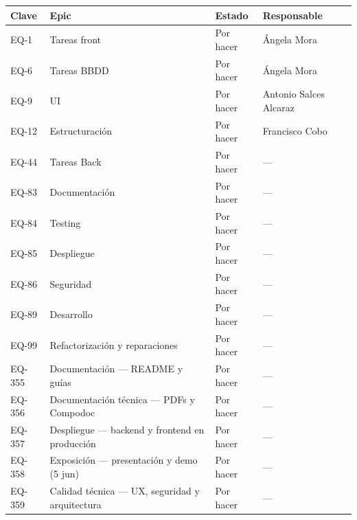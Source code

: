 \documentclass[
  spanish,
  11pt,
]{report}
\newcounter{none} %
\begin{document}
{\def\LTcaptype{none} %
\begin{longtable}[]{@{}
  >{\raggedright\arraybackslash}p{}
  >{\raggedright\arraybackslash}p{}
  >{\raggedright\arraybackslash}p{}
  >{\raggedright\arraybackslash}p{}@{}}
\toprule\noalign{}
\begin{minipage}[b]{\linewidth}\raggedright
Clave
\end{minipage} & \begin{minipage}[b]{\linewidth}\raggedright
Epic
\end{minipage} & \begin{minipage}[b]{\linewidth}\raggedright
Estado
\end{minipage} & \begin{minipage}[b]{\linewidth}\raggedright
Responsable
\end{minipage} \\
\midrule\noalign{}
\endhead
\bottomrule\noalign{}
\endlastfoot
EQ-1 & Tareas front & Por hacer & Ángela Mora \\
EQ-6 & Tareas BBDD & Por hacer & Ángela Mora \\
EQ-9 & UI & Por hacer & Antonio Salces Alcaraz \\
EQ-12 & Estructuración & Por hacer & Francisco Cobo \\
EQ-44 & Tareas Back & Por hacer & --- \\
EQ-83 & Documentación & Por hacer & --- \\
EQ-84 & Testing & Por hacer & --- \\
EQ-85 & Despliegue & Por hacer & --- \\
EQ-86 & Seguridad & Por hacer & --- \\
EQ-89 & Desarrollo & Por hacer & --- \\
EQ-99 & Refactorización y reparaciones & Por hacer & --- \\
EQ-355 & Documentación --- README y guías & Por hacer & --- \\
EQ-356 & Documentación técnica --- PDFs y Compodoc & Por hacer & --- \\
EQ-357 & Despliegue --- backend y frontend en producción & Por hacer &
--- \\
EQ-358 & Exposición --- presentación y demo (5 jun) & Por hacer & --- \\
EQ-359 & Calidad técnica --- UX, seguridad y arquitectura & Por hacer &
--- \\
\end{longtable}
}
\end{document}

